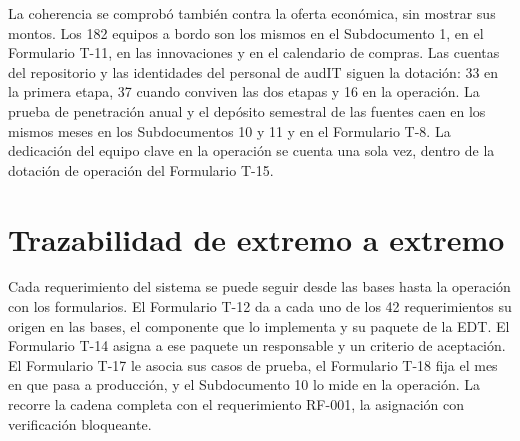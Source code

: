 La coherencia se comprobó también contra la oferta económica, sin mostrar sus montos. Los 182 equipos a
bordo son los mismos en el Subdocumento 1, en el Formulario T-11, en las innovaciones y en el
calendario de compras. Las cuentas del repositorio y las identidades del personal de audIT siguen la
dotación: 33 en la primera etapa, 37 cuando conviven las dos etapas y 16 en la operación. La prueba de penetración anual y
el depósito semestral de las fuentes caen en los mismos meses en los Subdocumentos 10 y 11 y en el
Formulario T-8. La dedicación del equipo clave en la operación se cuenta una sola vez, dentro de la
dotación de operación del Formulario T-15.

\section{Trazabilidad de extremo a extremo}\label{sec:14-trazabilidad-de-extremo-a-extrem}

Cada requerimiento del sistema se puede seguir desde las bases hasta la operación con los formularios.
El Formulario T-12 da a cada uno de los 42 requerimientos su origen en las bases, el componente que lo
implementa y su paquete de la EDT. El Formulario T-14 asigna a ese paquete un responsable y un criterio
de aceptación. El Formulario T-17 le asocia sus casos de prueba, el Formulario T-18 fija el mes en que
pasa a producción, y el Subdocumento 10 lo mide en la operación. La  recorre la
cadena completa con el requerimiento RF-001, la asignación con verificación bloqueante.

